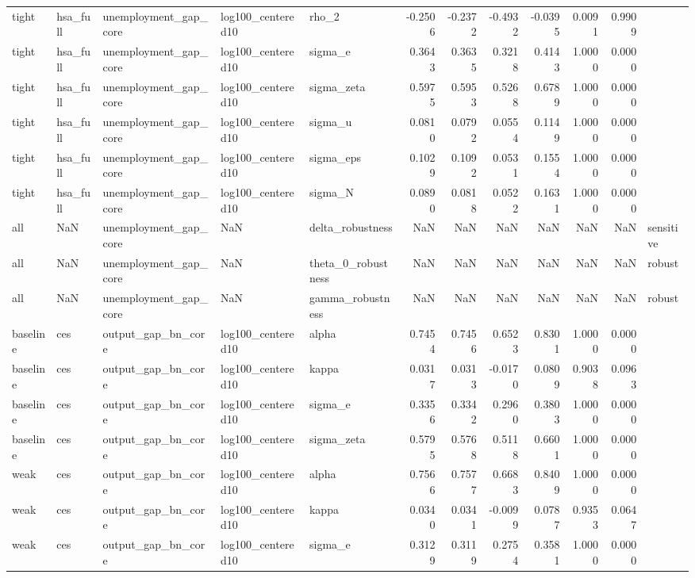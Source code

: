 \begin{tabular}{lllllrrrrrrl}
tight & hsa\_full & unemployment\_gap\_core & log100\_centered10 & rho\_2 & -0.2506 & -0.2372 & -0.4932 & -0.0395 & 0.0091 & 0.9909 &  \\
tight & hsa\_full & unemployment\_gap\_core & log100\_centered10 & sigma\_e & 0.3643 & 0.3635 & 0.3218 & 0.4143 & 1.0000 & 0.0000 &  \\
tight & hsa\_full & unemployment\_gap\_core & log100\_centered10 & sigma\_zeta & 0.5975 & 0.5953 & 0.5268 & 0.6789 & 1.0000 & 0.0000 &  \\
tight & hsa\_full & unemployment\_gap\_core & log100\_centered10 & sigma\_u & 0.0810 & 0.0792 & 0.0554 & 0.1149 & 1.0000 & 0.0000 &  \\
tight & hsa\_full & unemployment\_gap\_core & log100\_centered10 & sigma\_eps & 0.1029 & 0.1092 & 0.0531 & 0.1554 & 1.0000 & 0.0000 &  \\
tight & hsa\_full & unemployment\_gap\_core & log100\_centered10 & sigma\_N & 0.0890 & 0.0818 & 0.0522 & 0.1631 & 1.0000 & 0.0000 &  \\
all & NaN & unemployment\_gap\_core & NaN & delta\_robustness & NaN & NaN & NaN & NaN & NaN & NaN & sensitive \\
all & NaN & unemployment\_gap\_core & NaN & theta\_0\_robustness & NaN & NaN & NaN & NaN & NaN & NaN & robust \\
all & NaN & unemployment\_gap\_core & NaN & gamma\_robustness & NaN & NaN & NaN & NaN & NaN & NaN & robust \\
baseline & ces & output\_gap\_bn\_core & log100\_centered10 & alpha & 0.7454 & 0.7456 & 0.6523 & 0.8301 & 1.0000 & 0.0000 &  \\
baseline & ces & output\_gap\_bn\_core & log100\_centered10 & kappa & 0.0317 & 0.0313 & -0.0170 & 0.0809 & 0.9038 & 0.0963 &  \\
baseline & ces & output\_gap\_bn\_core & log100\_centered10 & sigma\_e & 0.3356 & 0.3342 & 0.2960 & 0.3803 & 1.0000 & 0.0000 &  \\
baseline & ces & output\_gap\_bn\_core & log100\_centered10 & sigma\_zeta & 0.5795 & 0.5768 & 0.5118 & 0.6601 & 1.0000 & 0.0000 &  \\
weak & ces & output\_gap\_bn\_core & log100\_centered10 & alpha & 0.7566 & 0.7577 & 0.6683 & 0.8409 & 1.0000 & 0.0000 &  \\
weak & ces & output\_gap\_bn\_core & log100\_centered10 & kappa & 0.0340 & 0.0341 & -0.0099 & 0.0787 & 0.9353 & 0.0647 &  \\
weak & ces & output\_gap\_bn\_core & log100\_centered10 & sigma\_e & 0.3129 & 0.3119 & 0.2754 & 0.3581 & 1.0000 & 0.0000 &  \\

\end{tabular}
